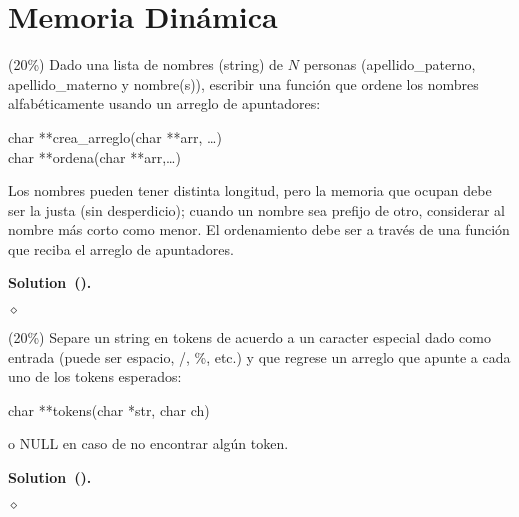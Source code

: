 \documentclass{article}
\theoremstyle{problemstyle}
\newenvironment{solution}[2]{%
  \begin{mdframed}[linewidth=0.8pt,linecolor=Gray,backgroundcolor=Gray!5,roundcorner=5pt, nobreak=#2]%
    \noindent\textbf{Solution\if\relax\detokenize{#1}\relax\else~(#1)\fi.}%
}{%
\hfill $ \diamond $ 
  \end{mdframed}%
}
\begin{document}
\section*{Memoria Din\'amica}\label{sec:memoria_din_amica} %
\begin{problem}
(20\%) Dado una lista de nombres (string) de $ N $ personas (apellido\_paterno, apellido\_materno y nombre(s)), escribir una funci\'on que ordene los nombres alfab\'eticamente usando un arreglo de apuntadores:
\begin{center}
	char **crea\_arreglo(char **arr, \dots)\\
	char **ordena(char **arr,\dots)
\end{center}
Los nombres pueden tener distinta longitud, pero la memoria que ocupan debe ser la justa (sin desperdicio); cuando un nombre sea prefijo de otro, considerar al nombre m\'as corto como menor. El ordenamiento debe ser a trav\'es de una funci\'on que reciba el arreglo de apuntadores.
\end{problem}
\begin{solution}{}{false}

	
\end{solution}

\begin{problem}
(20\%) Separe un string en tokens de acuerdo a un caracter especial dado como entrada (puede ser espacio, /, \%, etc.) y que regrese un arreglo que apunte a cada uno de los tokens esperados:
\begin{center}
	char **tokens(char *str, char ch)
\end{center}
o NULL en caso de no encontrar alg\'un token.

\end{problem}

\begin{solution}{}{false}

	
\end{solution}
\end{document}
